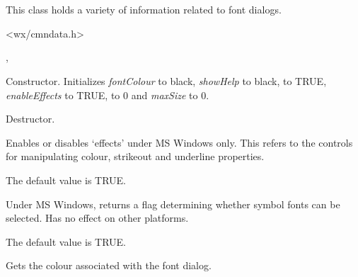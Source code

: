 \section{}\label{wxfontdata}


This class holds a variety of information related to font dialogs.




<wx/cmndata.h>


, 




Constructor. Initializes {\it fontColour} to black, {\it showHelp} to black,
 to TRUE, {\it enableEffects} to TRUE,
 to 0 and {\it maxSize} to 0.



Destructor.



Enables or disables `effects' under MS Windows only. This refers to the
controls for manipulating colour, strikeout and underline properties.

The default value is TRUE.



Under MS Windows, returns a flag determining whether symbol fonts can be selected. Has no
effect on other platforms.

The default value is TRUE.



Gets the colour associated with the font dialog.

